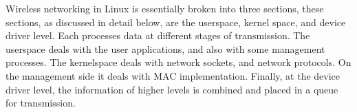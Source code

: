 Wireless networking in Linux is essentially broken into three sections, these
sections, as discussed in detail below, are the userspace, kernel space, and
device driver level. Each processes data at different stages of transmission.
The userspace deals with the user applications, and also with some management
processes. The kernelspace deals with network sockets, and network protocols. On
the management side it deals with MAC implementation. Finally, at the device
driver level, the information of higher levels is combined and placed in a queue
for transmission\cite{chou_2015}.
